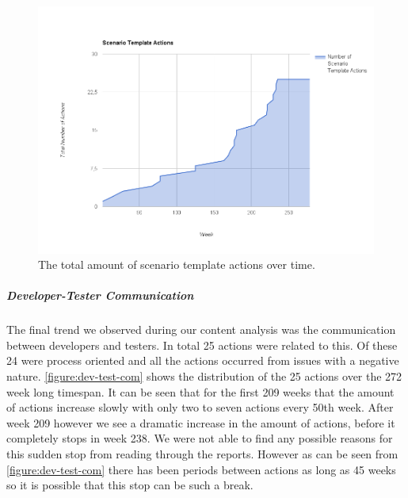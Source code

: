 \begin{figure}[!h]
	\centering
	\includegraphics[width=\textwidth, keepaspectratio]{figures/Scenario-tpl.png}
	\caption{The total amount of scenario template actions over time.}
	\label{figure:scenario-template}
\end{figure}
\afterpage{\clearpage}

\subparagraph{Developer-Tester Communication}
The final trend we observed during our content analysis was the communication between developers and testers. In total 25 actions were related to this. Of these 24 were process oriented and all the actions occurred from issues with a negative nature. 
\autoref{figure:dev-test-com} shows the distribution of the 25 actions over the 272 week long timespan. It can be seen that for the first 209 weeks that the amount of actions increase slowly with only two to seven actions every 50th week. After week 209 however we see a dramatic increase in the amount of actions, before it completely stops in week 238. We were not able to find any possible reasons for this sudden stop from reading through the reports. However as can be seen from \autoref{figure:dev-test-com} there has been periods between actions as long as 45 weeks so it is possible that this stop can be such a break.  

